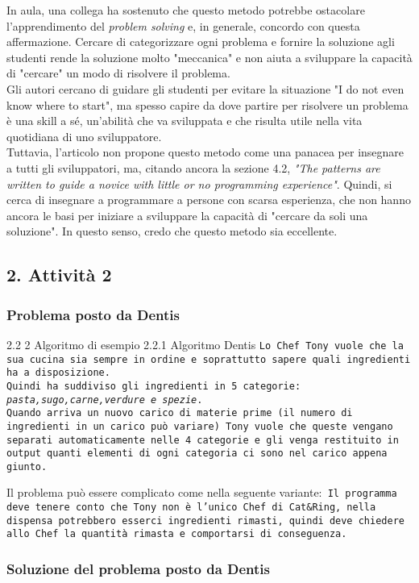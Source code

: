 \documentclass[a4paper]{article}
\begin{document}
In aula, una collega ha sostenuto che questo metodo potrebbe ostacolare l'apprendimento del \textit{problem solving} e, in generale, concordo con questa affermazione.
Cercare di categorizzare ogni problema e fornire la soluzione agli studenti rende la soluzione molto "meccanica" e non aiuta a sviluppare la capacità di "cercare" un modo di risolvere il problema.\\
Gli autori cercano di guidare gli studenti per evitare la situazione "I do not even know where to start", ma spesso capire da dove partire per risolvere un problema è una skill a sé, un'abilità che va sviluppata e che risulta utile nella vita quotidiana di uno sviluppatore.\\

Tuttavia, l'articolo non propone questo metodo come una panacea per insegnare a tutti gli sviluppatori, ma, citando ancora la sezione 4.2, \textit{"The patterns are written to guide a novice with little or no programming experience"}.
Quindi, si cerca di insegnare a programmare a persone con scarsa esperienza, che non hanno ancora le basi per iniziare a sviluppare la capacità di "cercare da soli una soluzione". In questo senso, credo che questo metodo sia eccellente.

\subsection{2. Attività 2}
\subsubsection{Problema posto da Dentis}
2.2 2 Algoritmo di esempio 2.2.1 Algoritmo Dentis
\texttt{Lo Chef Tony vuole che la sua cucina sia sempre in ordine e soprattutto sapere quali ingredienti ha a disposizione.\\Quindi ha suddiviso gli ingredienti in 5 categorie: \textit{pasta,sugo,carne,verdure e spezie}.\\ Quando arriva un nuovo carico di materie prime (il numero di ingredienti in un carico può variare) Tony vuole che queste vengano separati automaticamente nelle 4 categorie e gli venga restituito in output quanti elementi di ogni categoria ci sono nel carico appena giunto.}

Il problema può essere complicato come nella seguente variante:\texttt{ Il programma deve tenere conto che Tony non è l'unico Chef di Cat\&Ring, nella dispensa potrebbero esserci ingredienti rimasti, quindi deve chiedere allo Chef la quantità rimasta e comportarsi di conseguenza.}
\subsubsection{Soluzione del problema posto da Dentis}
\printbibliography
\end{document}
